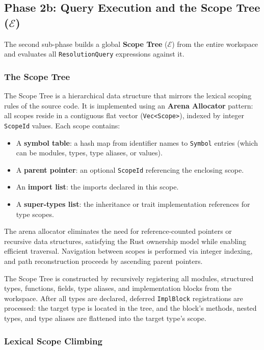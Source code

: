 \subsection{Phase 2b: Query Execution and the Scope Tree ($\mathcal{E}$)}
\label{sec:query_execution}

The second sub-phase builds a global \textbf{Scope Tree} ($\mathcal{E}$) from the entire workspace and evaluates all \texttt{ResolutionQuery} expressions against it.

\subsubsection{The Scope Tree}

The Scope Tree is a hierarchical data structure that mirrors the lexical scoping rules of the source code. It is implemented using an \textbf{Arena Allocator} pattern: all scopes reside in a contiguous flat vector (\texttt{Vec<Scope>}), indexed by integer \texttt{ScopeId} values. Each scope contains:
\begin{itemize}
  \item A \textbf{symbol table}: a hash map from identifier names to \texttt{Symbol} entries (which can be modules, types, type aliases, or values).
  \item A \textbf{parent pointer}: an optional \texttt{ScopeId} referencing the enclosing scope.
  \item An \textbf{import list}: the imports declared in this scope.
  \item A \textbf{super-types list}: the inheritance or trait implementation references for type scopes.
\end{itemize}

The arena allocator eliminates the need for reference-counted pointers or recursive data structures, satisfying the Rust ownership model while enabling efficient traversal. Navigation between scopes is performed via integer indexing, and path reconstruction proceeds by ascending parent pointers.

The Scope Tree is constructed by recursively registering all modules, structured types, functions, fields, type aliases, and implementation blocks from the workspace. After all types are declared, deferred \texttt{ImplBlock} registrations are processed: the target type is located in the tree, and the block's methods, nested types, and type aliases are flattened into the target type's scope.

\subsubsection{Lexical Scope Climbing}

